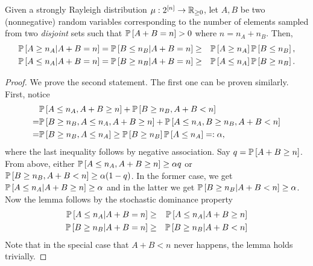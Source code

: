 \begin{lemma}\label{lem:updowntruncation}
Given a strongly Rayleigh distribution $\mu:2^{[n]}\to \R_{\geq 0}$, let $A,B$ be two (nonnegative) random variables corresponding to the number of elements sampled from two {\em disjoint} sets such that  $\P{A+B=n}>0$ where $n=n_A+n_B$. Then,
\begin{eqnarray}
	\P{A\geq n_A | A+B=n}=\P{B\leq n_B | A+B=n} & \geq & \P{A\geq n_A}\P{B\leq n_B},  \\
	\P{A\leq n_A|A+B=n}=\P{B\geq n_B | A+B=n}  &\geq &  \P{A\leq n_A}\P{B\geq n_B}.
\end{eqnarray} 
\end{lemma}
\begin{proof}
We prove the second statement. The first one can be proven similarly.
First, notice
\begin{align*}
	&\P{A\leq n_A , A+B \geq n} + \P{B\geq n_B , A+B < n}\\
	=&\P{B\geq n_B, A\leq n_A, A+B\geq n} + \P{A\leq n_A, B\geq n_B, A+B< n}\\
	=& \P{B\geq n_B, A\leq n_A} \geq \P{B\geq n_B}\P{A\leq n_A}=:\alpha,
\end{align*}
where the last inequality follows by negative association.
Say $q=\P{A+B\geq n}$.
From above, either $\P{A\leq n_A, A+B \geq n}\geq \alpha q$ or $\P{B\geq n_B, A+B<n}\geq \alpha (1-q)$. In the former case, we get $\P{A\leq n_A | A+B\geq n}\geq \alpha$ and in the latter we get $\P{B\geq n_B | A+B<n}\geq \alpha$.
Now the lemma follows by the stochastic dominance property
\begin{eqnarray*} 
\P{A\leq n_A | A+B=n} &\geq& \P{A\leq n_A | A+B \geq n} \\
\P{B\geq n_B | A+B=n} &\geq& \P{B\geq n_B | A+B < n}	
\end{eqnarray*}
Note that in the special case that $A+B<n$ never happens, the lemma holds trivially.
\end{proof}

